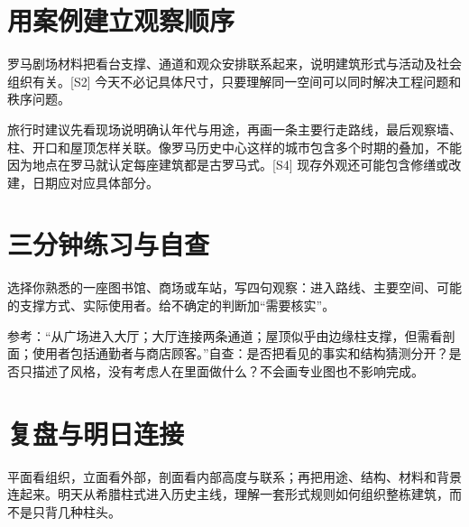 \documentclass[11pt]{article}
\newcommand{\Needspace}[1]{\par\ifdim\dimexpr\pagegoal-\pagetotal\relax<#1\relax\newpage\fi}
\begin{document}
\Needspace{5\baselineskip}\section*{用案例建立观察顺序}

罗马剧场材料把看台支撑、通道和观众安排联系起来，说明建筑形式与活动及社会组织有关。[S2] 今天不必记具体尺寸，只要理解同一空间可以同时解决工程问题和秩序问题。

旅行时建议先看现场说明确认年代与用途，再画一条主要行走路线，最后观察墙、柱、开口和屋顶怎样关联。像罗马历史中心这样的城市包含多个时期的叠加，不能因为地点在罗马就认定每座建筑都是古罗马式。[S4] 现存外观还可能包含修缮或改建，日期应对应具体部分。

\Needspace{5\baselineskip}\section*{三分钟练习与自查}

选择你熟悉的一座图书馆、商场或车站，写四句观察：进入路线、主要空间、可能的支撑方式、实际使用者。给不确定的判断加“需要核实”。

参考：“从广场进入大厅；大厅连接两条通道；屋顶似乎由边缘柱支撑，但需看剖面；使用者包括通勤者与商店顾客。”自查：是否把看见的事实和结构猜测分开？是否只描述了风格，没有考虑人在里面做什么？不会画专业图也不影响完成。

\Needspace{5\baselineskip}\section*{复盘与明日连接}

平面看组织，立面看外部，剖面看内部高度与联系；再把用途、结构、材料和背景连起来。明天从希腊柱式进入历史主线，理解一套形式规则如何组织整栋建筑，而不是只背几种柱头。
\end{document}
